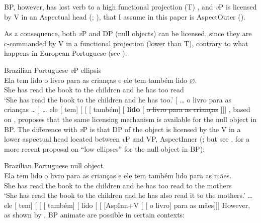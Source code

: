 \documentclass[output=paper]{langsci/langscibook}
\begin{document}
BP, however, has lost verb  to a high functional projection (T)
\citep{Galves2001}, and \emph{v}P  is licensed by V in an Aspectual
head (\citealt{CyrinoMatos2002,CyrinoMatos2005};
\citealt{Cyrino2010,Cyrino2013}), that I assume in this paper is AspectOuter
(\citealt{MacDonald2008}).

As a consequence, both \emph{v}P  and DP  (null objects) can be
licensed, since they are c-commanded by V in a functional projection (lower
than T), contrary to what happens in European Portuguese (see
\citealt{CyrinoMatos2016}):

\ea\label{ex:27.6} Brazilian Portuguese \emph{v}P ellipsis\\
    \ea
        \gll Ela tem lido   o   livro   para   as  crianças e ele     tem também   lido \textbf{$\varnothing$}.\\
            She has read   the   book to     the children and he   has   too read {}\\
        \glt `She has read the book to the children and he has too.'
    \ex {}[ \dots{} o livro para as crianças \dots{} ] \dots{} ele
    [ tem] [ 
    [ [ também]
    [\textbf{ }\textbf{lido}
    [\emph{} \sout{o livro para as crianças} ]]]
    \z
\z
\citet{Cyrino2016}, based on \citet{CyrinoMatos2005}, proposes that the same
licensing mechanism is available for the null object in BP\@.
The difference with \emph{v}P  is that DP  of the
object is licensed by the V in a lower aspectual head located between \emph{v}P
and VP, AspectInner (\citealt{MacDonald2008}; but see
\citealt{Lopes2014,Lopes2015}, for a more recent proposal on ``low ellipses''
for the null object in BP):

\ea\label{ex:27.7} Brazilian Portuguese null object\\
    \ea
        \gll Ela tem lido o   livro para as   crianças  e ele tem também lido para as mães.\\
            She has read the book to  the children   and  he  has too read        to     the mothers\\
        \glt   `She has read the book to the children and he has also read it to   the mothers.'
    \ex {} \dots{}  ele [
    tem] [  [   [
    também] [\textbf{} lido [ [
    [AspInn+V  [    [ o livro] para as mães]]]
    \z
\z
However, as shown by \textcite{Cyrino1994,Cyrino1997}, \gls{BP} animate  are possible in certain contexts:
\end{document}
